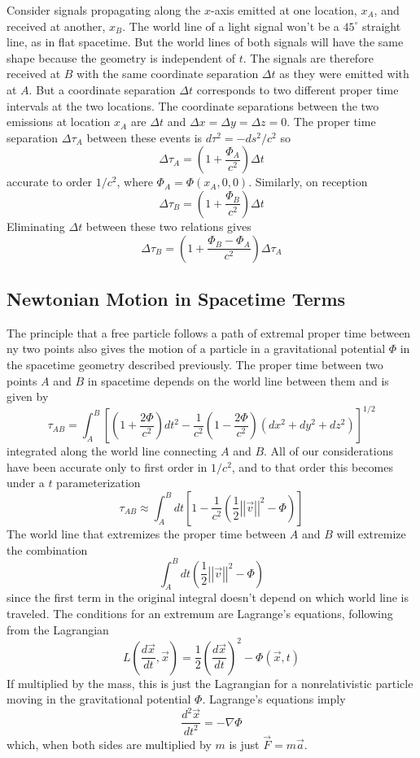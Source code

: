 Consider signals propagating along the $x$-axis emitted at one location, $x_A$, and received at another, $x_B$. The world line of a light signal won't be a $45^{\circ}$ straight line, as in flat spacetime. But the world lines of both signals will have the same shape because the geometry is independent of $t$. The signals are therefore received at $B$ with the same coordinate separation $\Delta t$ as they were emitted with at $A$. But a coordinate separation $\Delta t$ corresponds to two different proper time intervals at the two locations. The coordinate separations between the two emissions at location $x_A$ are $\Delta t$ and $\Delta x = \Delta y = \Delta z = 0$. The proper time separation $\Delta \tau_A$ between these events is $d\tau^2 = -ds^2/c^2$ so $$\Delta \tau_A = \left(1+\frac{\Phi_A}{c^2}\right)\Delta t$$
accurate to order $1/c^2$, where $\Phi_A = \Phi(x_A,0,0)$. Similarly, on reception $$\Delta \tau_B = \left(1+\frac{\Phi_B}{c^2}\right)\Delta t$$
Eliminating $\Delta t$ between these two relations gives $$\Delta \tau_B = \left(1+\frac{\Phi_B-\Phi_A}{c^2}\right)\Delta \tau_A$$


\subsection{Newtonian Motion in Spacetime Terms}

The principle that a free particle follows a path of extremal proper time between ny two points also gives the motion of a particle in a gravitational potential $\Phi$ in the spacetime geometry described previously. The proper time between two points $A$ and $B$ in spacetime depends on the world line between them and is given by $$\tau_{AB} = \int_A^B\left[\left(1+\frac{2\Phi}{c^2}\right)dt^2-\frac{1}{c^2}\left(1-\frac{2\Phi}{c^2}\right)(dx^2+dy^2+dz^2)\right]^{1/2}$$
integrated along the world line connecting $A$ and $B$. All of our considerations have been accurate only to first order in $1/c^2$, and to that order this becomes under a $t$ parameterization $$\tau_{AB} \approx \int_A^Bdt\left[1-\frac{1}{c^2}\left(\frac{1}{2}\left|\left|\vec{v}\right|\right|^2-\Phi\right)\right]$$
The world line that extremizes the proper time between $A$ and $B$ will extremize the combination $$\int_A^Bdt\left(\frac{1}{2}\left|\left|\vec{v}\right|\right|^2-\Phi\right)$$
since the first term in the original integral doesn't depend on which world line is traveled. The conditions for an extremum are Lagrange's equations, following from the Lagrangian $$L\left(\frac{d\vec{x}}{dt},\vec{x}\right) = \frac{1}{2}\left(\frac{d\vec{x}}{dt}\right)^2-\Phi(\vec{x},t)$$
If multiplied by the mass, this is just the Lagrangian for a nonrelativistic particle moving in the gravitational potential $\Phi$. Lagrange's equations imply $$\frac{d^2\vec{x}}{dt^2} = -\nabla\Phi$$
which, when both sides are multiplied by $m$ is just $\vec{F} = m\vec{a}$.

